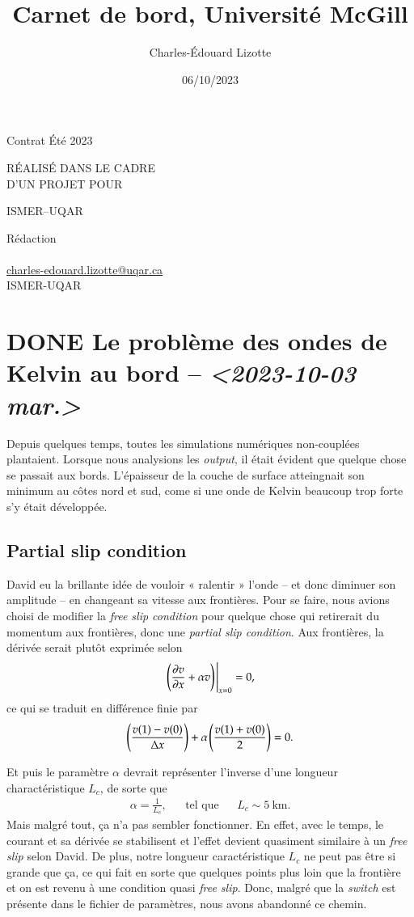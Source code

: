 \documentclass[10pt]{article}
\author{Charles-Édouard Lizotte}
\date{06/10/2023}
\title{Carnet de bord, Université McGill}
\makeatletter
\numberwithin{equation}{section}
\newcommand{\pt}{\hspace{1pt}} %
\newcommand{\mytitlepage}{
\begin{titlepage}
\begin{center}
{\Large Contrat Été 2023 \par}
\vspace{2cm}
{\Large \MakeUppercase{\thetitle} \par}
\vspace{2cm}
RÉALISÉ DANS LE CADRE\\ D'UN PROJET POUR \par
\vspace{2cm}
{\Large ISMER--UQAR \par}
\vspace{2cm}
{\thedate}
\end{center}
\vfill
Rédaction \\
{\theauthor}\\
\url{charles-edouard.lizotte@uqar.ca}\\
ISMER-UQAR
\end{titlepage}
}
\makeatother
\begin{document}
\mytitlepage
\tableofcontents\newpage

\section{{\bfseries\sffamily DONE} Le problème des ondes de Kelvin au bord -- \textit{<2023-10-03 mar.>}}
\label{sec:org8c9b828}
Depuis quelques temps, toutes les simulations numériques non-couplées plantaient.
Lorsque nous analysions les \emph{output}, il était évident que quelque chose se passait aux bords.
L'épaisseur de la couche de surface atteingnait son minimum au côtes nord et sud, come si une onde de Kelvin beaucoup trop forte s'y était développée.

\subsection{Partial slip condition}
\label{sec:org7426121}
David eu la brillante idée de vouloir « ralentir » l'onde -- et donc diminuer son amplitude -- en changeant sa vitesse aux frontières.
Pour se faire, nous avions choisi de modifier la \emph{free slip condition} pour quelque chose qui retirerait du momentum aux frontières, donc une \emph{partial slip condition}.
Aux frontières, la dérivée serait plutôt exprimée selon
\begin{equation}
   \eval{\qty(\pdv{v}{x} + \alpha v)\pt}_{x=0} = 0,
\end{equation}
ce qui se traduit en différence finie par
\begin{equation}
   \qty(\frac{v(1) - v(0)}{\Delta x}) + \alpha\pt\qty( \frac{v(1)+v(0)}{2}) = 0.
\end{equation}

Et puis le paramètre \(\alpha\) devrait représenter l'inverse d'une longueur charactéristique \(L_c\), de sorte que
\begin{align}
   && \alpha = \frac{1}{L_c}, && \text{tel que} && L_c \sim 5\ \text{km}. && 
\end{align}
Mais malgré tout, ça n'a pas sembler fonctionner.
En effet, avec le temps, le courant et sa dérivée se stabilisent et l'effet devient quasiment similaire à un \emph{free slip} selon David.
De plus, notre longueur caractéristique \(L_c\) ne peut pas être si grande que ça, ce qui fait en sorte que quelques points plus loin que la frontière et on est revenu à une condition quasi \emph{free slip}.
Donc, malgré que la \emph{switch} est présente dans le fichier de paramètres, nous avons abandonné ce chemin.
\end{document}
